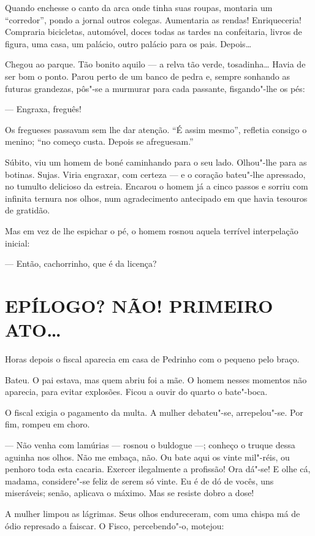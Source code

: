 Quando enchesse o canto da arca onde tinha suas roupas, montaria um
``corredor'', pondo a jornal outros colegas. Aumentaria as rendas!
Enriqueceria! Compraria bicicletas, automóvel, doces todas as tardes na
confeitaria, livros de figura, uma casa, um palácio, outro palácio para
os pais. Depois\ldots{}

Chegou ao parque. Tão bonito aquilo --- a relva tão verde, tosadinha\ldots{}
Havia de ser bom o ponto. Parou perto de um banco de pedra e, sempre
sonhando as futuras grandezas, pôs"-se a murmurar para cada passante,
fisgando"-lhe os pés:

--- Engraxa, freguês!

Os fregueses passavam sem lhe dar atenção. ``É assim mesmo'', refletia
consigo o menino; ``no começo custa. Depois se afreguesam.''

Súbito, viu um homem de boné caminhando para o seu lado. Olhou"-lhe para
as botinas. Sujas. Viria engraxar, com certeza --- e o coração bateu"-lhe
apressado, no tumulto delicioso da estreia. Encarou o homem já a cinco
passos e sorriu com infinita ternura nos olhos, num agradecimento
antecipado em que havia tesouros de gratidão.

Mas em vez de lhe espichar o pé, o homem rosnou aquela terrível
interpelação inicial:

--- Então, cachorrinho, que é da licença?

\section*{EPÍLOGO? NÃO! PRIMEIRO ATO\ldots{}}

Horas depois o fiscal aparecia em casa de Pedrinho com o pequeno pelo
braço.

Bateu. O pai estava, mas quem abriu foi a mãe. O homem nesses momentos
não aparecia, para evitar explosões. Ficou a ouvir do quarto o
bate"-boca.

O fiscal exigia o pagamento da multa. A mulher debateu"-se, arrepelou"-se.
Por fim, rompeu em choro.

--- Não venha com lamúrias --- rosnou o buldogue ---; conheço o truque
dessa aguinha nos olhos. Não me embaça, não. Ou bate aqui os vinte
mil"-réis, ou penhoro toda esta cacaria. Exercer ilegalmente a profissão!
Ora dá"-se! E olhe cá, madama, considere"-se feliz de serem só vinte. Eu é
de dó de vocês, uns miseráveis; senão, aplicava o máximo. Mas se resiste
dobro a dose!

A mulher limpou as lágrimas. Seus olhos endureceram, com uma chispa má
de ódio represado a faiscar. O Fisco, percebendo"-o, motejou:

